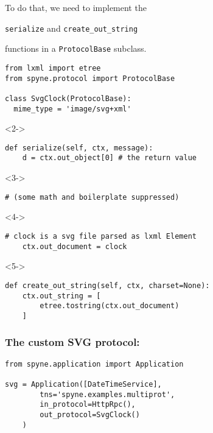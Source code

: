 \documentclass{beamer}
\begin{document}
\begin{frame}
  \LARGE
  \begin{center}
    To do that, we need to implement the

    \bigskip

    \texttt{serialize} and \texttt{create\_out\_string}

    \bigskip

    functions in a \texttt{ProtocolBase} subclass.
  \end{center}
\end{frame}

\begin{frame}[fragile]
  \small
  \begin{lstlisting}[frame=none]
from lxml import etree
from spyne.protocol import ProtocolBase

class SvgClock(ProtocolBase):
  mime_type = 'image/svg+xml'
  \end{lstlisting}

\begin{uncoverenv}<2->
  \begin{lstlisting}[frame=none]
  def serialize(self, ctx, message):
    d = ctx.out_object[0] # the return value
  \end{lstlisting}
\end{uncoverenv}
\begin{uncoverenv}<3->
  \begin{lstlisting}[frame=none]
    # (some math and boilerplate suppressed)
  \end{lstlisting}
\end{uncoverenv}
\begin{uncoverenv}<4->
  \begin{lstlisting}[frame=none]
    # clock is a svg file parsed as lxml Element
    ctx.out_document = clock
  \end{lstlisting}
\end{uncoverenv}

\begin{uncoverenv}<5->
  \begin{lstlisting}[frame=none]
  def create_out_string(self, ctx, charset=None):
    ctx.out_string = [
        etree.tostring(ctx.out_document)
    ]
  \end{lstlisting}
\end{uncoverenv}
\end{frame}

\begin{frame}[fragile]
\frametitle{The custom SVG protocol:}
\begin{lstlisting}[emph={SvgClock}]
from spyne.application import Application

svg = Application([DateTimeService],
        tns='spyne.examples.multiprot',
        in_protocol=HttpRpc(),
        out_protocol=SvgClock()
    )

\end{lstlisting}

\end{frame}
\end{document}
